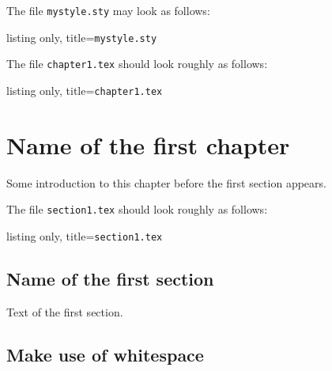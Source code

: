 %
The file \texttt{mystyle.sty} may look as follows:
%
\begin{tcblisting}{listing only, title={\texttt{mystyle.sty}}}

\usepackage{mathtools}
\usepackage{amssymb}

\usepackage{tikz-cd}


\DeclareMathOperator{\End}{End}
\DeclareMathOperator{\Hom}{Hom}
\end{tcblisting}
%
The file \texttt{chapter1.tex} should look roughly as follows:
%
\begin{tcblisting}{listing only, title={\texttt{chapter1.tex}}}
\chapter{Name of the first chapter}

Some introduction to this chapter before the first section appears.



\end{tcblisting}
%
The file \texttt{section1.tex} should look roughly as follows:
%
\begin{tcblisting}{listing only, title={\texttt{section1.tex}}}
\section{Name of the first section}

Text of the first section.
\end{tcblisting}





\section{Make use of whitespace}

